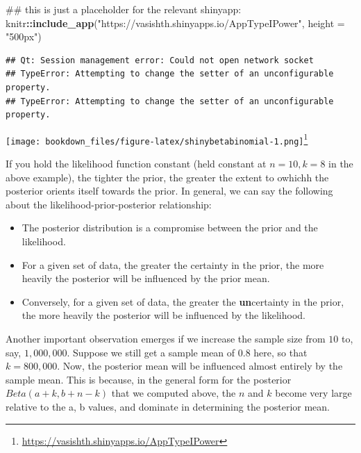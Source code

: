 \documentclass[12pt,]{krantz}
\newenvironment{Shaded}{\begin{snugshade}}{\end{snugshade}}
\newcommand{\KeywordTok}[1]{\textcolor[rgb]{0.13,0.29,0.53}{\textbf{#1}}}
\newcommand{\DataTypeTok}[1]{\textcolor[rgb]{0.13,0.29,0.53}{#1}}
\newcommand{\StringTok}[1]{\textcolor[rgb]{0.31,0.60,0.02}{#1}}
\newcommand{\OperatorTok}[1]{\textcolor[rgb]{0.81,0.36,0.00}{\textbf{#1}}}
\newcommand{\NormalTok}[1]{#1}
\providecommand{\tightlist}{%
  \setlength{\itemsep}{0pt}\setlength{\parskip}{0pt}}
\renewcommand{\href}[2]{#2\footnote{\url{#1}}}
\theoremstyle{definition}
\theoremstyle{definition}
\theoremstyle{definition}
\theoremstyle{remark}
\begin{document}
\begin{Shaded}
\begin{Highlighting}[]
\NormalTok{## this is just  a placeholder for the relevant shinyapp:}
\NormalTok{knitr}\OperatorTok{::}\KeywordTok{include_app}\NormalTok{(}\StringTok{"https://vasishth.shinyapps.io/AppTypeIPower"}\NormalTok{, }
  \DataTypeTok{height =} \StringTok{"500px"}\NormalTok{)}
\end{Highlighting}
\end{Shaded}

\begin{verbatim}
## Qt: Session management error: Could not open network socket
## TypeError: Attempting to change the setter of an unconfigurable property.
## TypeError: Attempting to change the setter of an unconfigurable property.
\end{verbatim}

\href{https://vasishth.shinyapps.io/AppTypeIPower}{\texttt{[image: bookdown\_files/figure-latex/shinybetabinomial-1.png]}}

If you hold the likelihood function constant (held constant at
\(n=10, k=8\) in the above example), the tighter the prior, the greater
the extent to owhichh the posterior orients itself towards the prior. In
general, we can say the following about the likelihood-prior-posterior
relationship:

\begin{itemize}
\tightlist
\item
  The posterior distribution is a compromise between the prior and the
  likelihood.
\item
  For a given set of data, the greater the certainty in the prior, the
  more heavily the posterior will be influenced by the prior mean.
\item
  Conversely, for a given set of data, the greater the
  \textbf{un}certainty in the prior, the more heavily the posterior will
  be influenced by the likelihood.
\end{itemize}

Another important observation emerges if we increase the sample size
from \(10\) to, say, \(1,000,000\). Suppose we still get a sample mean
of \(0.8\) here, so that \(k=800,000\). Now, the posterior mean will be
influenced almost entirely by the sample mean. This is because, in the
general form for the posterior \(Beta(a+k,b+n-k)\) that we computed
above, the \(n\) and \(k\) become very large relative to the a, b
values, and dominate in determining the posterior mean.
\end{document}
